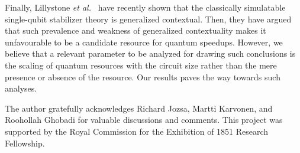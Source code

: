 \documentclass[prl,twocolumn,amsmath,amssymb,nofootinbib]{revtex4-1}
\begin{document}
Finally, Lillystone \textit{et al.}~\cite{Lillystone2019} have recently shown that the classically simulatable single-qubit stabilizer theory is generalized contextual.
Then, they have argued that such prevalence and weakness of generalized contextuality makes it unfavourable to be a candidate resource for quantum speedups.
However, we believe that a relevant parameter to be analyzed for drawing such conclusions is the scaling of quantum resources with the circuit size rather than the mere presence or absence of the resource.
Our results paves the way towards such analyses.


\begin{acknowledgements}
The author gratefully acknowledges Richard Jozsa, Martti Karvonen, and Roohollah Ghobadi for valuable discussions and comments.
This project was supported by the Royal Commission for the Exhibition of 1851 Research Fellowship. 
\end{acknowledgements}




\end{document}
